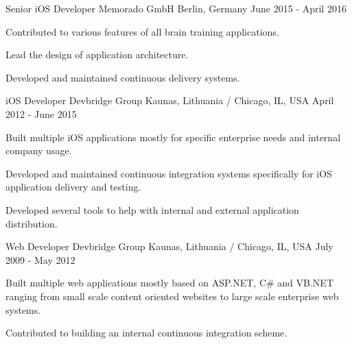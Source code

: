 \begin{cventries}
  \cventry
    {Senior iOS Developer} %
    {Memorado GmbH} %
    {Berlin, Germany} %
    {June 2015 - April 2016} %
    {
      \begin{cvitems} %
        \item {Contributed to various features of all brain training applications.}
        \item {Lead the design of application architecture.}
        \item {Developed and maintained continuous delivery systems.}
      \end{cvitems}
    }

  \cventry
    {iOS Developer} %
    {Devbridge Group} %
    {Kaunas, Lithuania / Chicago, IL, USA} %
    {April 2012 - June 2015} %
    {
      \begin{cvitems} %
        \item {Built multiple iOS applications mostly for specific enterprise needs and internal company usage.}
        \item {Developed and maintained continuous integration systems specifically for iOS application delivery and testing.}
        \item {Developed several tools to help with internal and external application distribution.}
      \end{cvitems}
    }

  \cventry
    {Web Developer} %
    {Devbridge Group} %
    {Kaunas, Lithuania / Chicago, IL, USA} %
    {July 2009 - May 2012} %
    {
      \begin{cvitems} %
        \item {Built multiple web applications mostly based on ASP.NET, C\# and VB.NET ranging from small scale content oriented websites to large scale enterprise web systems.}
        \item {Contributed to building an internal continuous integration scheme.}
      \end{cvitems}
    }

\end{cventries}
